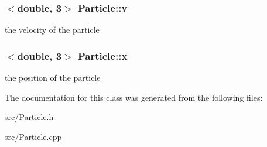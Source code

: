 \subsubsection[{v}]{$<$double, 3$>$ Particle\+::v\hspace{0.3cm}{\ttfamily [private]}}\label{classParticle_ac3669e50d83d8608d522965b9acd1d8b}
the velocity of the particle \hypertarget{classParticle_a3789900d6fe19a75d3a82cd5e9622c4c}{}
\subsubsection[{x}]{$<$double, 3$>$ Particle\+::x\hspace{0.3cm}{\ttfamily [private]}}\label{classParticle_a3789900d6fe19a75d3a82cd5e9622c4c}
the position of the particle 

The documentation for this class was generated from the following files\+:\begin{DoxyCompactItemize}
\item 
src/\hyperlink{Particle_8h}{Particle.\+h}\item 
src/\hyperlink{Particle_8cpp}{Particle.\+cpp}\end{DoxyCompactItemize}
